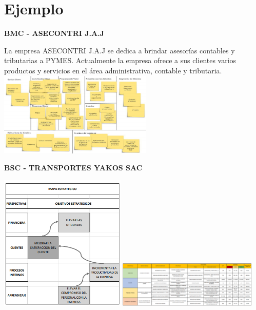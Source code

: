 \documentclass[%
 reprint,
 amsmath,amssymb,
 aps,
]{revtex4-1}
\begin{document}
\section{Ejemplo}

\par \textbf{BMC - ASECONTRI J.A.J} \\
\par La empresa ASECONTRI J.A.J se dedica a brindar
asesorías contables y tributarias a PYMES. Actualmente la empresa ofrece a sus clientes
varios productos y servicios en el área administrativa, contable y
tributaria.
\newline
\newline
\includegraphics[width=0.55\textwidth]{./Imagenes/1}\cite{2}

\par \textbf{BSC - TRANSPORTES YAKOS SAC} 
\newline
\begin{center}
\includegraphics[width=0.45\textwidth]{./Imagenes/2}\cite{1}
\includegraphics[width=0.5\textwidth]{./Imagenes/4} \cite{1}
\end{center}


\end{document}

